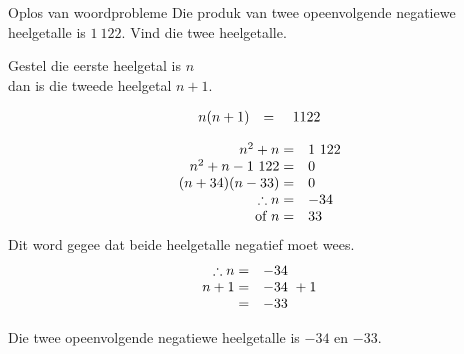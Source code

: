 \begin{wex}
{Oplos van woordprobleme}
{
Die produk van twee opeenvolgende negatiewe heelgetalle is $1~122$. Vind die twee heelgetalle.
} 
{
Gestel die eerste heelgetal is $n$ 
\\dan is die tweede heelgetal $n+1$.\par 

\begin{equation*}
\begin{array}{cll}\hfill n(n+1)& =& ~1122\hfill \end{array}
\end{equation*}

\begin{equation*}
    \begin{array}{cll}
	\hfill n^{2} + n =& 1~122\hfill \\
\hfill n^{2} + n - 1~122 =& 0\hfill \\
\hfill (n+34)(n-33) =& 0\hfill \\
	\hfill \therefore  n =& -34 \hfill \\
\hfill \mbox{ of } n =& 33\hfill 
    \end{array}
\end{equation*}
Dit word gegee dat beide heelgetalle negatief moet wees.
\begin{equation*}
    \begin{array}{cll}
	\hfill \therefore n =& -34\hfill \\
\hfill n + 1 =& -34\ + 1 \hfill \\
\hfill  =& -33\hfill \\

    \end{array}
\end{equation*}

Die twee opeenvolgende negatiewe heelgetalle is $-34$ en $-33$.
}
\end{wex}

